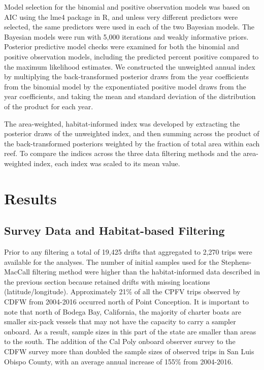 \documentclass[
  12pt,
  authoryear,
  preprint,
  3p]{elsarticle}
\begin{document}
Model selection for the binomial and positive observation models was
based on AIC using the lme4 package in R, and unless very different
predictors were selected, the same predictors were used in each of the
two Bayesian models. The Bayesian models were run with 5,000 iterations
and weakly informative priors. Posterior predictive model checks were
examined for both the binomial and positive observation models,
including the predicted percent positive compared to the maximum
likelihood estimates. We constructed the unweighted annual index by
multiplying the back-transformed posterior draws from the year
coefficients from the binomial model by the exponentiated positive model
draws from the year coefficients, and taking the mean and standard
deviation of the distribution of the product for each year.

The area-weighted, habitat-informed index was developed by extracting
the posterior draws of the unweighted index, and then summing across the
product of the back-transformed posteriors weighted by the fraction of
total area within each reef. To compare the indices across the three
data filtering methods and the area-weighted index, each index was
scaled to its mean value.

\hypertarget{results}{%
\section{Results}\label{results}}

\hypertarget{survey-data-and-habitat-based-filtering-1}{%
\subsection{Survey Data and Habitat-based
Filtering}\label{survey-data-and-habitat-based-filtering-1}}

Prior to any filtering a total of 19,425 drifts that aggregated to 2,270
trips were available for the analyses. The number of initial samples
used for the Stephens-MacCall filtering method were higher than the
habitat-informed data described in the previous section because retained
drifts with missing locations (latitude/longitude). Approximately 21\%
of all the CPFV trips observed by CDFW from 2004-2016 occurred north of
Point Conception. It is important to note that north of Bodega Bay,
California, the majority of charter boats are smaller six-pack vessels
that may not have the capacity to carry a sampler onboard. As a result,
sample sizes in this part of the state are smaller than areas to the
south. The addition of the Cal Poly onboard observer survey to the CDFW
survey more than doubled the sample sizes of observed trips in San Luis
Obispo County, with an average annual increase of 155\% from 2004-2016.
\end{document}
